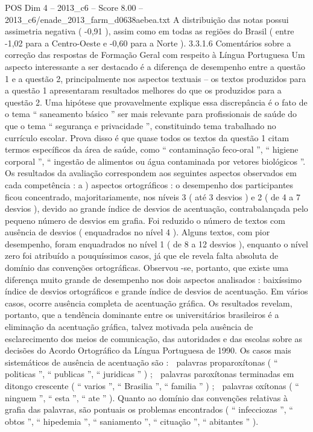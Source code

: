 \begin{textsample}{POS Dim 4 – 2013\_c6 – Score 8.00 – 2013\_c6/enade\_2013\_farm\_d0638aebea.txt}
A distribuição das notas possui assimetria negativa ( -0,91 ), assim como em todas as regiões do Brasil ( entre -1,02 para a Centro-Oeste e -0,60 para a Norte ). 3.3.1.6 Comentários sobre a correção das respostas de Formação Geral com respeito à Língua Portuguesa Um aspecto interessante a ser destacado é a diferença de desempenho entre a questão 1 e a questão 2, principalmente nos aspectos textuais – os textos produzidos para a questão 1 apresentaram resultados melhores do que os produzidos para a questão 2.
Uma hipótese que provavelmente explique essa discrepância é o fato de o tema “ saneamento básico ” ser mais relevante para profissionais de saúde do que o tema “ segurança e privacidade ”, constituindo tema trabalhado no currículo escolar.
Prova disso é que quase todos os textos da questão 1 citam termos específicos da área de saúde, como “ contaminação feco-oral ”, “ higiene corporal ”, “ ingestão de alimentos ou água contaminada por vetores biológicos ”.
Os resultados da avaliação correspondem aos seguintes aspectos observados em cada competência : a ) aspectos ortográficos : o desempenho dos participantes ficou concentrado, majoritariamente, nos níveis 3 ( até 3 desvios ) e 2 ( de 4 a 7 desvios ), devido ao grande índice de desvios de acentuação, contrabalançada pelo pequeno número de desvios em grafia.
Foi reduzido o número de textos com ausência de desvios ( enquadrados no nível 4 ).
Alguns textos, com pior desempenho, foram enquadrados no nível 1 ( de 8 a 12 desvios ), enquanto o nível zero foi atribuído a pouquíssimos casos, já que ele revela falta absoluta de domínio das convenções ortográficas.
Observou -se, portanto, que existe uma diferença muito grande de desempenho nos dois aspectos analisados : baixíssimo índice de desvios ortográficos e grande índice de desvios de acentuação.
Em vários casos, ocorre ausência completa de acentuação gráfica.
Os resultados revelam, portanto, que a tendência dominante entre os universitários brasileiros é a eliminação da acentuação gráfica, talvez motivada pela ausência de esclarecimento dos meios de comunicação, das autoridades e das escolas sobre as decisões do Acordo Ortográfico da Língua Portuguesa de 1990.
Os casos mais sistemáticos de ausência de acentuação são :  palavras proparoxítonas ( “ politicas ”, “ publicas ”, “ juridicas ” ) ;  palavras paroxítonas terminadas em ditongo crescente ( “ varios ”, “ Brasilia ”, “ familia ” ) ;  palavras oxítonas ( “ ninguem ”, “ esta ”, “ ate ” ).
Quanto ao domínio das convenções relativas à grafia das palavras, são pontuais os problemas encontrados ( “ infecciozas ”, “ obtos ”, “ hipedemia ”, “ saniamento ”, “ cituação ”, “ abitantes ” ).

\end{textsample}
